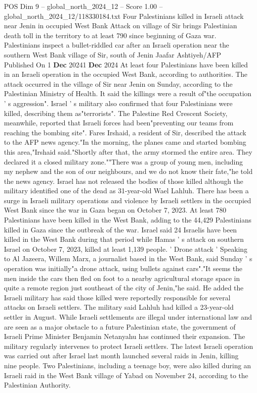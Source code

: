 \begin{textsample}{POS Dim 9 – global\_north\_2024\_12 – Score 1.00 – global\_north\_2024\_12/118330184.txt}  \label{ex:f9_pos_334}
Four Palestinians killed in Israeli attack near Jenin in occupied West Bank Attack on village of Sir brings Palestinian death toll in the territory to at least 790 since beginning of Gaza war.
Palestinians inspect a bullet-riddled car after an Israeli operation near the southern West Bank village of Sir, south of Jenin Jaafar Ashtiyeh/AFP Published On 1 \textbf{Dec} 20241 \textbf{Dec} 2024 At least four Palestinians have been killed in an Israeli operation in the occupied West Bank, according to authorities.
The attack occurred in the village of Sir near Jenin on Sunday, according to the Palestinian Ministry of Health.
It said the killings were a result of"the occupation ' s aggression".
Israel ' s military also confirmed that four Palestinians were killed, describing them as"terrorists".
The Palestine Red Crescent Society, meanwhile, reported that Israeli forces had been"preventing our teams from reaching the bombing site".
Fares Irshaid, a resident of Sir, described the attack to the AFP news agency."In the morning, the planes came and started bombing this area,"Irshaid said."Shortly after that, the army stormed the entire area.
They declared it a closed military zone.""There was a group of young men, including my nephew and the son of our neighbours, and we do not know their fate,"he told the news agency.
Israel has not released the bodies of those killed although the military identified one of the dead as 31-year-old Wael Lahluh.
There has been a surge in Israeli military operations and violence by Israeli settlers in the occupied West Bank since the war in Gaza began on October 7, 2023.
At least 780 Palestinians have been killed in the West Bank, adding to the 44,429 Palestinians killed in Gaza since the outbreak of the war.
Israel said 24 Israelis have been killed in the West Bank during that period while Hamas ' s attack on southern Israel on October 7, 2023, killed at least 1,139 people. ' Drone attack ' Speaking to Al Jazeera, Willem Marx, a journalist based in the West Bank, said Sunday ' s operation was initially"a drone attack, using bullets against cars"."It seems the men inside the cars then fled on foot to a nearby agricultural storage space in quite a remote region just southeast of the city of Jenin,"he said.
He added the Israeli military has said those killed were reportedly responsible for several attacks on Israeli settlers.
The military said Lahluh had killed a 23-year-old settler in August.
While Israeli settlements are illegal under international law and are seen as a major obstacle to a future Palestinian state, the government of Israeli Prime Minister Benjamin Netanyahu has continued their expansion.
The military regularly intervenes to protect Israeli settlers.
The latest Israeli operation was carried out after Israel last month launched several raids in Jenin, killing nine people.
Two Palestinians, including a teenage boy, were also killed during an Israeli raid in the West Bank village of Yabad on November 24, according to the Palestinian Authority.

\end{textsample}
